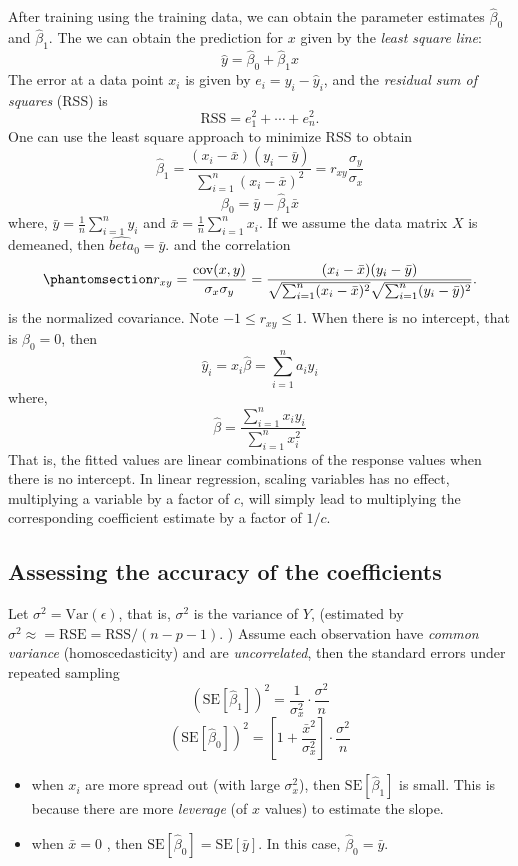 \documentclass[
  letterpaper,
  DIV=11,
  numbers=noendperiod]{scrreprt}
\begin{document}
After training using the training data, we can obtain the parameter
estimates \(\hat{\beta}_0\) and \(\hat{\beta}_1\). The we can obtain the
prediction for \(x\) given by the \emph{least square line}: \[
\hat{y} = \hat{\beta}_0 + \hat{\beta}_1 x
\] The error at a data point \(x_i\) is given by
\(e_i = y_i -\hat{y}_i\), and the \emph{residual sum of squares} (RSS)
is \[
\text{RSS} =e_1^2+\cdots +e_n^2. 
\] One can use the least square approach to minimize RSS to obtain \[
\hat{\beta}_1 =\frac{(x_i-\bar{x})(y_i-\bar{y})}{\sum_{i=1}^n(x_i-\bar{x})^2}=r_{xy}\frac{\sigma_y}{\sigma_x}
\] \[
\hat{\beta}_0= \bar{y}-\hat{\beta}_1 \bar{x}
\] where, \(\bar{y}=\frac{1}{n}\sum_{i=1}^n y_i\) and
\(\bar{x}=\frac{1}{n}\sum_{i=1}^n x_i\). If we assume the data matrix
\(X\) is demeaned, then \(\hat{beta}_0=\bar{y}\). and the correlation
\begin{equation}\phantomsection\label{eq-correlation-rxy}{
r_{xy} = \frac{\text{cov}(x,y)}{\sigma_x\sigma_y}=\frac{(x_i-\bar{x})(y_i-\bar{y})}{\sqrt{\sum_{i=1}^n(x_i-\bar{x})^2}\sqrt{\sum_{i=1}^n(y_i-\bar{y})^2}}.
}\end{equation} is the normalized covariance. Note
\(-1\le r_{xy} \le 1\). When there is no intercept, that is
\(\beta_0=0\), then \[
\hat{y}_i=x_i \hat{\beta}=\sum_{i=1}^n a_i y_i
\] where, \[
\hat{\beta} =\frac{\sum_{i=1}^n x_iy_i}{ \sum_{i=1}^{n} x_i^2}
\] That is, the fitted values are linear combinations of the response
values when there is no intercept. In linear regression, scaling
variables has no effect, multiplying a variable by a factor of \(c\),
will simply lead to multiplying the corresponding coefficient estimate
by a factor of \(1/c\).

\subsection{Assessing the accuracy of the
coefficients}\label{assessing-the-accuracy-of-the-coefficients}

Let \(\sigma^2=\text{Var}(\epsilon)\), that is, \(\sigma^2\) is the
variance of \(Y\), (estimated by
\(\sigma^2\approx =\text{RSE} =\text{RSS}/(n-p-1)\). ) Assume each
observation have \emph{common variance} (homoscedasticity) and are
\emph{uncorrelated}, then the standard errors under repeated sampling \[
(\text{SE}[\hat{\beta}_1])^2 = \frac{1}{\sigma^2_x}\cdot \frac{\sigma^2}{n}
\] \[
(\text{SE}[\hat{\beta}_0])^2 = \left[1+ \frac{\bar{x}^2}{\sigma^2_x} \right]\cdot \frac{\sigma^2}{n}
\]

\begin{itemize}
\item
  when \(x_i\) are more spread out (with large \(\sigma_x^2\)), then
  \(\text{SE}[\hat{\beta}_1]\) is small. This is because there are more
  \emph{leverage} (of \(x\) values) to estimate the slope.
\item
  when \(\bar{x} =0\) , then
  \(\text{SE}[\hat{\beta}_0] = \text{SE}[\bar{y}]\). In this case,
  \(\hat{\beta}_0 = \bar{y}\).
\end{itemize}
\end{document}
